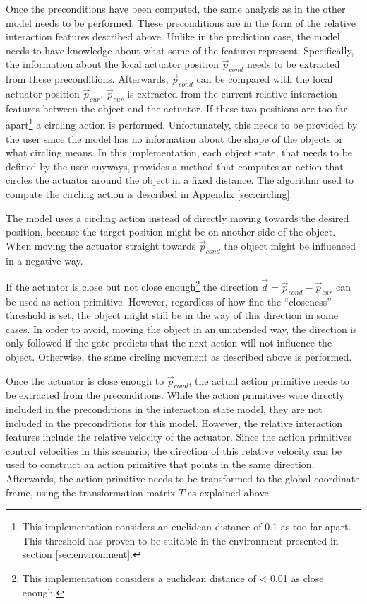 Once the preconditions have been computed, the same analysis as in the other model needs to be performed. These preconditions are in the form of the relative interaction features described above.
Unlike in the prediction case, the model needs to have knowledge about what some of the features represent. Specifically, the information about the local actuator position $\vec{p}_{cond}$ needs to be extracted from these preconditions. Afterwards, $\vec{p}_{cond}$ can be compared with the local actuator position $\vec{p}_{cur}$. $\vec{p}_{cur}$ is extracted from the current relative interaction features between the object and the actuator. 
If these two positions are too far apart\footnote{This implementation considers an euclidean distance of 0.1 as too far apart. This threshold has proven to be suitable in the environment presented in section \ref{sec:environment}.} a circling action is performed. Unfortunately, this needs to be provided by the user since the model has no information about the shape of the objects or what circling means. In this implementation, each object state, that needs to be defined by the user anyways, provides a method that computes an action that circles the actuator around the object in a fixed distance.
The algorithm used to compute the circling action is described in Appendix \ref{sec:circling}.

The model uses a circling action instead of directly moving towards the desired position, because the target position might be on another side of the object. When moving the actuator straight towards $\vec{p}_{cond}$ the object might be influenced in a negative way.

If the actuator is close but not close enough\footnote{This implementation considers a euclidean distance of < 0.01 as close enough.} the direction $\vec{d} = \vec{p}_{cond} - \vec{p}_{cur}$ can be used as action primitive.
However, regardless of how fine the \enquote{closeness} threshold is set, the object might still be in the way of this direction in some cases. In order to avoid, moving the object in an unintended way, the direction is only followed if the gate predicts that the next action will not influence the object. Otherwise, the same circling movement as described above is performed.

Once the actuator is close enough to $\vec{p}_{cond}$, the actual action primitive needs to be extracted from the preconditions. 
While the action primitives were directly included in the preconditions in the interaction state model, they are not included in the preconditions for this model. 
However, the relative interaction features include the relative velocity of the actuator. 
Since the action primitives control velocities in this scenario, the direction of this relative velocity can be used to construct an action primitive that points in the same direction. Afterwards, the action primitive needs to be transformed to the global coordinate frame, using the transformation matrix $T$ as explained above.

